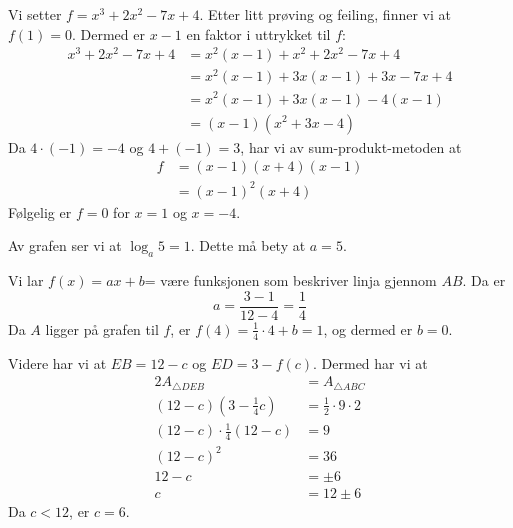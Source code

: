Vi setter $f=x^3+2x^2-7x+4$. Etter litt prøving og feiling, finner vi at $f(1)=0$. Dermed er $x-1$ en faktor i uttrykket til $f$:
\begin{align*}
	x^3+2x^2-7x+4 &= x^2(x-1)+x^2+2x^2-7x+4 \\
	&= x^2(x-1)+3x(x-1)+3x-7x+4 \\
	&= x^2(x-1)+3x(x-1)-4(x-1) \\
	&= (x-1)(x^2+3x-4)
\end{align*}
Da $4\cdot(-1)=-4$ og $4+(-1)=3$, har vi av sum-produkt-metoden at
\begin{align*}
	f&=(x-1)(x+4)(x-1) \\
	&= (x-1)^2(x+4)
\end{align*}
Følgelig er $f=0$ for $x=1$ og $x=-4$.
\newpage
{}

Av grafen ser vi at $\log_a 5=1$. Dette må bety at $a=5$.


Vi lar $f(x)=ax+b$= være funksjonen som beskriver linja gjennom $AB$. Da er
\[ a=\frac{3-1}{12-4}=\frac{1}{4} \]
Da $A$ ligger på grafen til $f$, er $f(4)=\frac{1}{4}\cdot4+b=1$, og dermed er $b=0$. \vsk

Videre har vi at $EB=12-c$ og $ED=3-f(c)$. Dermed har vi at
\begin{align*}
	2A_{\triangle DEB}&=A_{\triangle ABC} \\
	(12-c)\left(3-\frac{1}{4}c\right)&=\frac{1}{2}\cdot9\cdot2 \\
	(12-c)\cdot\frac{1}{4}(12-c)&=9 \\
	(12-c)^2 &=36 \\
	12-c &= \pm 6 \\
	c&= 12\pm6
\end{align*}
Da $c<12$, er $c=6$.

